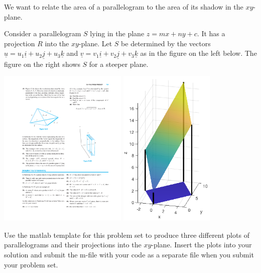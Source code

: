 \documentclass[12pt,letterpaper]{exam}
\newcommand{\mb}[1]{\underline{#1}}
\begin{document}
\begin{questions}
\begin{parts}
\end{parts}

\item We want to relate the area of a parallelogram to the area of its shadow in the $xy$-plane.



Consider a parallelogram $S$ lying in the plane $ z= mx + ny + c$.  It has a projection $R$ into the $xy$-plane.  Let $S$ be determined by the vectors $\mb{u} = u_1\mb{i}+u_2\mb{j}+u_3\mb{k}$ and $\mb{v} = v_1 \mb{i}+v_2\mb{j}+v_3\mb{k}$ as in the figure on the left below.  The figure on the right shows $S$ for a steeper plane.


\begin{center}
\includegraphics[height=3in]{img/HW04p1.pdf}\quad
\includegraphics[height=3in]{img/pset03plane.png}
\end{center}



\begin{parts}
\item Use the matlab template for this problem set to produce three different plots of parallelograms and their projections into the $xy$-plane.  Insert the plots into your solution and submit the m-file with your code as a separate file when you submit your problem set.


\end{parts}
\end{questions}
\end{document}
